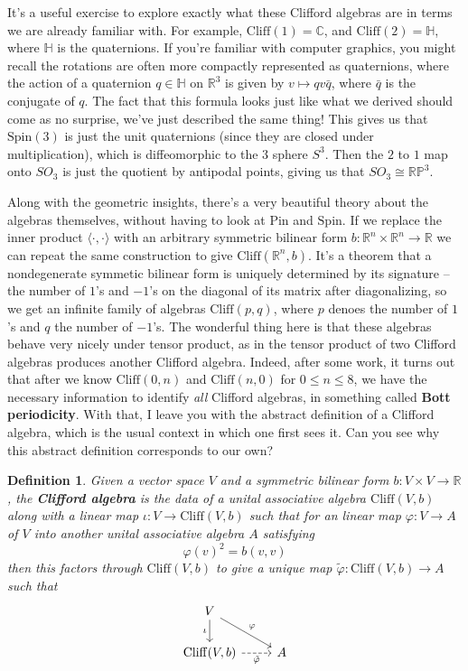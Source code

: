 \documentclass{article}
\newcommand{\C}{\mathbb{C}}
\newcommand{\R}{\mathbb{R}}
\newtheorem{definition}{Definition}[subsection]
\begin{document}
It's a useful exercise to explore exactly what these Clifford algebras are in terms we are already familiar with. For example, $\mathrm{Cliff}(1) = \C$, and $\mathrm{Cliff}(2) = \mathbb{H}$, where $\mathbb{H}$ is the quaternions. If you're familiar with computer graphics, you might recall the rotations are often more compactly represented as quaternions, where the action of a quaternion $q \in \mathbb{H}$ on $\R^3$ is given by $v \mapsto qv\bar{q}$, where $\bar{q}$ is the conjugate of $q$. The fact that this formula looks just like what we derived should come as no surprise, we've just described the same thing! This gives us that $\mathrm{Spin}(3)$ is just the unit quaternions (since they are closed under multiplication), which is diffeomorphic to the $3$ sphere $S^3$. Then the $2$ to $1$ map onto $SO_3$ is just the quotient by antipodal points, giving us that $SO_3 \cong \mathbb{RP}^3$.

Along with the geometric insights, there's a very beautiful theory about the algebras themselves, without having to look at $\mathrm{Pin}$ and $\mathrm{Spin}$. If we replace the inner product $\langle \cdot,\cdot \rangle$ with an arbitrary symmetric bilinear form $b : \R^n \times \R^n \to \R$ we can repeat the same construction to give $\mathrm{Cliff}(\R^n ,b)$. It's a theorem that a nondegenerate symmetic bilinear form is uniquely determined by its signature -- the number of $1$'s and $-1$'s on the diagonal of its matrix after diagonalizing, so we get an infinite family of algebras $\mathrm{Cliff}(p,q)$, where $p$ denoes the number of $1$'s and $q$ the number of $-1$'s. The wonderful thing here is that these algebras behave very nicely under tensor product, as in the tensor product of two Clifford algebras produces another Clifford algebra. Indeed, after some work, it turns out that after we know $\mathrm{Cliff}(0,n)$ and $\mathrm{Cliff}(n,0)$ for $0 \leq n \leq 8$, we have the necessary information to identify \emph{all} Clifford algebras, in something called \textbf{Bott periodicity}. With that, I leave you with the abstract definition of a Clifford algebra, which is the usual context in which one first sees it. Can you see why this abstract definition corresponds to our own?
\begin{definition}
Given a vector space $V$ and a symmetric bilinear form $b : V \times V \to \R$, the \textbf{Clifford algebra} is the data of a unital associative algebra $\mathrm{Cliff}(V,b)$ along with a linear map $\iota : V \to \mathrm{Cliff}(V,b)$ such that for an linear map $\varphi : V \to A$ of $V$ into another unital associative algebra $A$ satisfying 
$$\varphi(v)^2 = b(v,v) $$
then this factors through $\mathrm{Cliff}(V,b)$ to give a unique map $\tilde{\varphi} : \mathrm{Cliff}(V,b) \to A$ such that 
$$\begin{tikzcd} 
V \ar[d, "\iota"'] \ar[dr, "\varphi"] \\
\mathrm{Cliff}(V,b) \ar[r, "\tilde{\varphi}"', dashed] & A
\end{tikzcd}$$
\end{definition}
%
\end{document}
